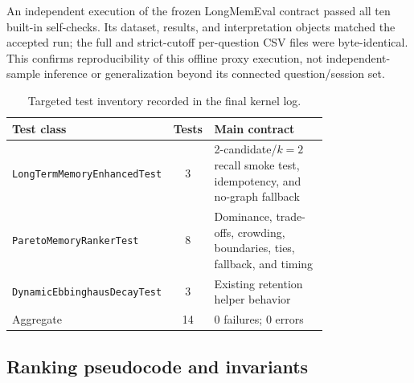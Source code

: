 \documentclass[review,12pt]{elsarticle}
\begin{document}
An independent execution of the frozen LongMemEval contract passed all ten built-in self-checks. Its dataset, results, and interpretation objects matched the accepted run; the full and strict-cutoff per-question CSV files were byte-identical. This confirms reproducibility of this offline proxy execution, not independent-sample inference or generalization beyond its connected question/session set.

\begin{table}[H]
\centering
\caption{Targeted test inventory recorded in the final kernel log.}
\label{tab:si-tests}
\begin{tabular}{p{0.42\linewidth}c p{0.36\linewidth}}
\toprule
Test class & Tests & Main contract \\
\midrule
\texttt{LongTermMemoryEnhancedTest} & 3 & 2-candidate/$k=2$ recall smoke test, idempotency, and no-graph fallback \\
\texttt{ParetoMemoryRankerTest} & 8 & Dominance, trade-offs, crowding, boundaries, ties, fallback, and timing \\
\texttt{DynamicEbbinghausDecayTest} & 3 & Existing retention helper behavior \\
\midrule
Aggregate & 14 & 0 failures; 0 errors \\
\bottomrule
\end{tabular}
\end{table}

\subsection{Ranking pseudocode and invariants}
\label{sec:si-pseudocode}
\end{document}
